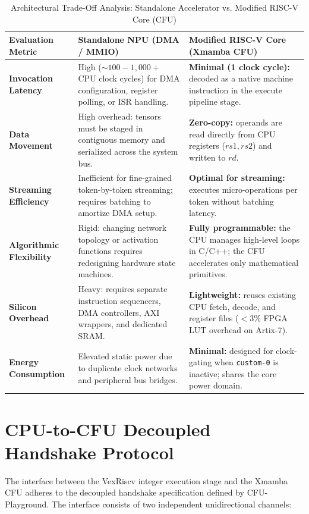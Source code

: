 \documentclass[11pt,a4paper,oneside]{report}
\begin{document}
\begin{table}[!htbp]
\caption[Architectural Trade-Off Analysis: Standalone NPU vs. CFU]{Architectural Trade-Off Analysis: Standalone Accelerator vs. Modified RISC-V Core (CFU)}
\label{tab:arch_tradeoffs}
\centering
\begin{tabularx}{\linewidth}{>{\raggedright\arraybackslash\bfseries}p{2.5cm}YY}
\toprule
\textbf{Evaluation Metric} & \textbf{Standalone NPU (DMA / MMIO)} & \textbf{Modified RISC-V Core (Xmamba CFU)} \\
\midrule
Invocation Latency & High ($\sim 100 - 1{,}000+$ CPU clock cycles) for DMA configuration, register polling, or ISR handling. & \textbf{Minimal (1 clock cycle):} decoded as a native machine instruction in the execute pipeline stage. \\
Data Movement & High overhead: tensors must be staged in contiguous memory and serialized across the system bus. & \textbf{Zero-copy:} operands are read directly from CPU registers ($rs1, rs2$) and written to $rd$. \\
Streaming Efficiency & Inefficient for fine-grained token-by-token streaming; requires batching to amortize DMA setup. & \textbf{Optimal for streaming:} executes micro-operations per token without batching latency. \\
Algorithmic Flexibility & Rigid: changing network topology or activation functions requires redesigning hardware state machines. & \textbf{Fully programmable:} the CPU manages high-level loops in C/C++; the CFU accelerates only mathematical primitives. \\
Silicon Overhead & Heavy: requires separate instruction sequencers, DMA controllers, AXI wrappers, and dedicated SRAM. & \textbf{Lightweight:} reuses existing CPU fetch, decode, and register files ($< 3\%$ FPGA LUT overhead on Artix-7). \\
Energy Consumption & Elevated static power due to duplicate clock networks and peripheral bus bridges. & \textbf{Minimal:} designed for clock-gating when \texttt{custom-0} is inactive; shares the core power domain. \\
\bottomrule
\end{tabularx}
\end{table}

\section{CPU-to-CFU Decoupled Handshake Protocol}
The interface between the VexRiscv integer execution stage and the Xmamba CFU adheres to the decoupled handshake specification defined by CFU-Playground. The interface consists of two independent unidirectional channels:
\end{document}
